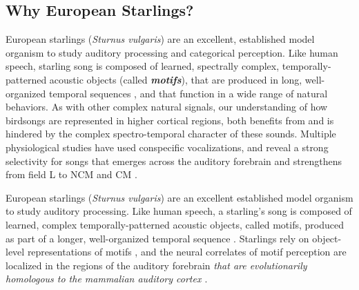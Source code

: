 \subsection{Why European Starlings?}

European starlings ({\it Sturnus vulgaris}) are an excellent, established model organism to study auditory processing and categorical perception. Like human speech, starling song is composed of learned, spectrally complex, temporally-patterned acoustic objects (called \textit{\textbf{motifs}}), that are produced in long, well-organized temporal sequences \cite{gentner2003neuronal}, and that function in a wide range of natural behaviors. As with other complex natural signals, our understanding of how birdsongs are represented in higher cortical regions, both benefits from and is hindered by the complex spectro-temporal character of these sounds. Multiple physiological studies have used conspecific vocalizations, and reveal a strong selectivity for songs that emerges across the auditory forebrain and strengthens from field L to \ac{NCM} and \ac{CM} \cite{gentner2003neuronal, gentner2004neural, thompson2010song, jeanne2011emergence}.

European starlings (\textit{Sturnus vulgaris}) are an excellent established model organism to study auditory processing. Like human speech, a starling's song is composed of learned, complex temporally-patterned acoustic objects, called motifs, produced as part of a longer, well-organized temporal sequence \cite{gentner2003neuronal}. Starlings rely on object-level representations of motifs \cite{Meliza2010,gentner1998perceptual,Comins2013,comins2014auditory}, and the neural correlates of motif perception are localized in the regions of the auditory forebrain \emph{that are evolutionarily homologous to the mammalian auditory cortex \cite{wang2010laminar}}. 


